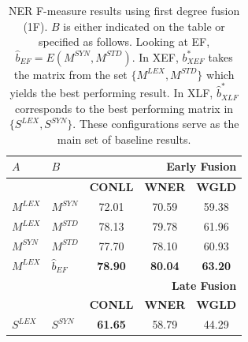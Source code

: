 \documentclass{llncs}
\newcommand\msyn{M^{\scriptscriptstyle SYN}}
\newcommand\mstd{M^{\scriptscriptstyle STD}}
\begin{document}
\begin{table}[!tb]
\centering
\setlength\tabcolsep{2pt}
\begin{minipage}[t]{0.48\textwidth}
\centering

\caption{NER F-measure results using first degree fusion (1F). $B$ is either indicated on the table or specified as follows. Looking at EF,  $\hat{b}_{EF} = E(\msyn, \mstd)$. In XEF, ${b}^*_{\scriptscriptstyle XEF}$ takes the matrix from the set $\{M^{\scriptscriptstyle LEX}, M^{\scriptscriptstyle STD} \}$ which yields the best performing result. In XLF, $\hat{b}_{\scriptscriptstyle XLF}^{*}$ corresponds to the best performing matrix in $\{S^{\scriptscriptstyle LEX},S^{\scriptscriptstyle SYN}\}$. These configurations serve as the main set of baseline results.}
\label{tab:ner-1d}
\centering
\begin{tabular}{@{}llccc@{}}
\toprule
    $A$      &    $B$       & \multicolumn{3}{r}{\textbf{Early Fusion} }                                            \\ \midrule
          &           & \textbf{CONLL}                      & \textbf{WNER}                      & \textbf{WGLD}                      \\ \cmidrule{3-5}
$M^{\scriptscriptstyle LEX}$ & $M^{\scriptscriptstyle SYN}$ & 72.01                      & 70.59                     & 59.38                     \\
$M^{\scriptscriptstyle LEX}$ & $M^{\scriptscriptstyle STD}$ & 78.13                      & 79.78                     & 61.96                     \\
$M^{\scriptscriptstyle SYN}$ & $M^{\scriptscriptstyle STD}$ & 77.70                      & 78.10                     & 60.93                     \\
$M^{\scriptscriptstyle LEX}$ & $\hat{b}_{EF}$ & \textbf{78.90}                      & \textbf{80.04}                     & \textbf{63.20}                     \\
\midrule
          &           & \multicolumn{3}{r}{\textbf{Late Fusion} }                                             \\
\midrule     
          &           & \textbf{CONLL}                      & \textbf{WNER}                      & \textbf{WGLD}                      \\ \cmidrule{3-5}
$S^{\scriptscriptstyle LEX}$ & $S^{\scriptscriptstyle SYN}$ & \textbf{61.65}                      & 58.79                     & 44.29                     \\

\end{tabular}
\end{minipage}
\end{table}
\end{document}

